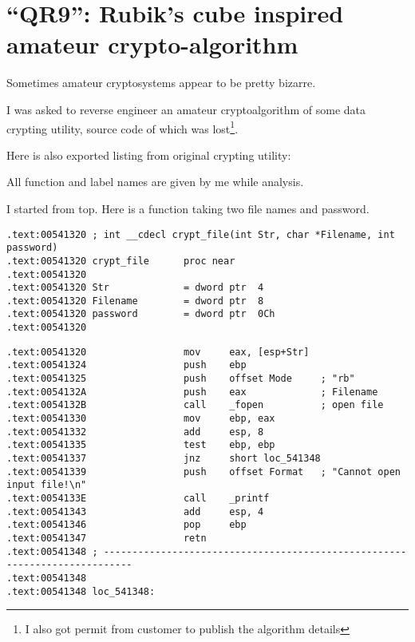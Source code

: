 \section{
{``QR9'': Rubik's cube inspired amateur crypto-algorithm}}

{Sometimes amateur cryptosystems appear to be pretty bizarre.}

{I was asked to reverse engineer an amateur cryptoalgorithm of some data crypting utility, 
source code of which was lost\footnote{I also got permit from customer to publish the algorithm details}.}

{Here is also \IDA exported listing from original crypting utility}:



{All function and label names are given by me while analysis.}

{I started from top. Here is a function taking two file names and password.}

\begin{lstlisting}
.text:00541320 ; int __cdecl crypt_file(int Str, char *Filename, int password)
.text:00541320 crypt_file      proc near
.text:00541320
.text:00541320 Str             = dword ptr  4
.text:00541320 Filename        = dword ptr  8
.text:00541320 password        = dword ptr  0Ch
.text:00541320
\end{lstlisting}


\begin{lstlisting}
.text:00541320                 mov     eax, [esp+Str]
.text:00541324                 push    ebp
.text:00541325                 push    offset Mode     ; "rb"
.text:0054132A                 push    eax             ; Filename
.text:0054132B                 call    _fopen          ; open file
.text:00541330                 mov     ebp, eax
.text:00541332                 add     esp, 8
.text:00541335                 test    ebp, ebp
.text:00541337                 jnz     short loc_541348
.text:00541339                 push    offset Format   ; "Cannot open input file!\n"
.text:0054133E                 call    _printf
.text:00541343                 add     esp, 4
.text:00541346                 pop     ebp
.text:00541347                 retn
.text:00541348 ; ---------------------------------------------------------------------------
.text:00541348
.text:00541348 loc_541348:
\end{lstlisting}

